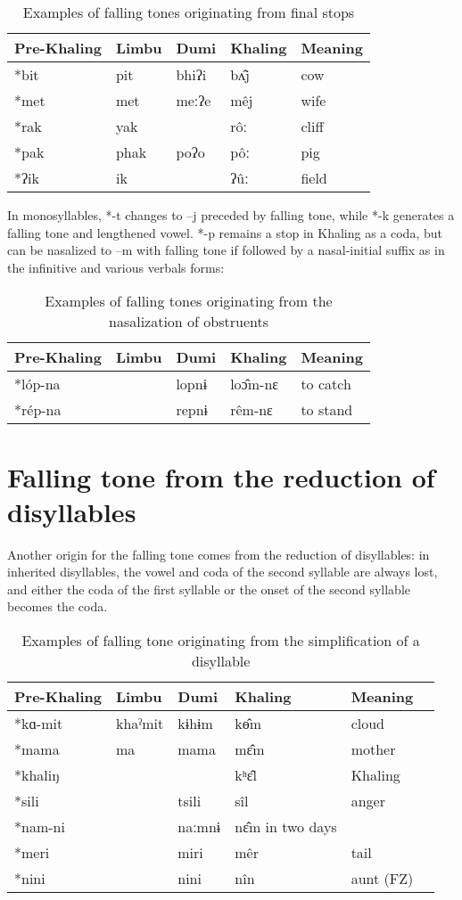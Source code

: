 \documentclass[oldfontcommands,oneside,a4paper,11pt]{article}
\begin{document}
\begin{table}[H]
\caption{Examples of falling tones originating from final stops} \centering
\begin{tabular}{lllll}
\toprule
Pre-Khaling	&Limbu	&Dumi	&Khaling	&Meaning\\
\midrule
*bit	&pit&	bhiʔi	& bʌ̂j&	cow\\
*met&	met	&meːʔe&	mêj&	wife\\
*rak	&yak	&&	rôː	&cliff\\
*pak&	phak	&poʔo	&pôː	&pig\\
*ʔik	&ik	&&	ʔûː	&field\\
\bottomrule
\end{tabular}
\end{table}
In monosyllables, *-t changes to –j preceded by falling tone, while *-k generates a falling tone and lengthened vowel. *-p remains a stop in Khaling as a coda, but can be nasalized to –m with falling tone if followed by a nasal-initial suffix as in the infinitive and various verbals forms:
\begin{table}[H]
\caption{Examples of falling tones originating from the nasalization of obstruents} \centering
\begin{tabular}{lllll}
\toprule
Pre-Khaling	&Limbu	&Dumi	&Khaling	&Meaning\\
\midrule
*lóp-na	&&lopnɨ	&loɔ̂m-nɛ	&to catch\\
*rép-na	&&repnɨ	&rêm-nɛ	&to stand\\
\bottomrule
\end{tabular}
\end{table}

\section{Falling tone from the reduction of disyllables} \label{sec:disyll}
Another origin for the falling tone comes from the reduction of disyllables: in inherited disyllables, the vowel and coda of the second syllable are always lost, and either the coda of the first syllable or the onset of the second syllable becomes the coda.
\begin{table}[H]
\caption{Examples of falling tone originating from the simplification of a disyllable} \centering
\begin{tabular}{llllll}
\toprule
Pre-Khaling	&Limbu	&Dumi	&Khaling	&Meaning\\
\midrule
*kɑ-mit	&khaˀmit	&kɨhɨm	&	kɵ̂m		&cloud\\
*mama	&ma		&mama	&	mɛ̂m		&mother\\
*khaliŋ				&&&	kʰɛ‍̂l	&	Khaling\\
*sili			&&	tsili	&	sîl	&	anger\\
*nam-ni	&&		naːmnɨ	&	nɛ̂m		in two days\\
*meri		&&		miri	&	mêr	&	tail\\
*nini			&&	nini	&	nîn		&aunt (FZ)\\
\bottomrule
\end{tabular}
\end{table}
\end{document}
